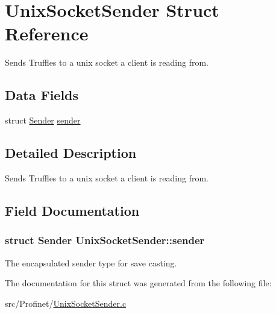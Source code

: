 \hypertarget{struct_unix_socket_sender}{\section{Unix\-Socket\-Sender Struct Reference}
\label{struct_unix_socket_sender}
}


Sends Truffles to a unix socket a client is reading from.  


\subsection*{Data Fields}
\begin{DoxyCompactItemize}
\item 
struct \hyperlink{struct_sender}{Sender} \hyperlink{struct_unix_socket_sender_a24b3558900d7939b7e292003b9fe853d}{sender}
\end{DoxyCompactItemize}


\subsection{Detailed Description}
Sends Truffles to a unix socket a client is reading from. 

\subsection{Field Documentation}
\hypertarget{struct_unix_socket_sender_a24b3558900d7939b7e292003b9fe853d}{
\subsubsection[{sender}]{\setlength{\rightskip}{0pt plus 5cm}struct {\bf Sender} Unix\-Socket\-Sender\-::sender}}\label{struct_unix_socket_sender_a24b3558900d7939b7e292003b9fe853d}
The encapsulated sender type for save casting. 

The documentation for this struct was generated from the following file\-:\begin{DoxyCompactItemize}
\item 
src/\-Profinet/\hyperlink{_unix_socket_sender_8c}{Unix\-Socket\-Sender.\-c}\end{DoxyCompactItemize}

